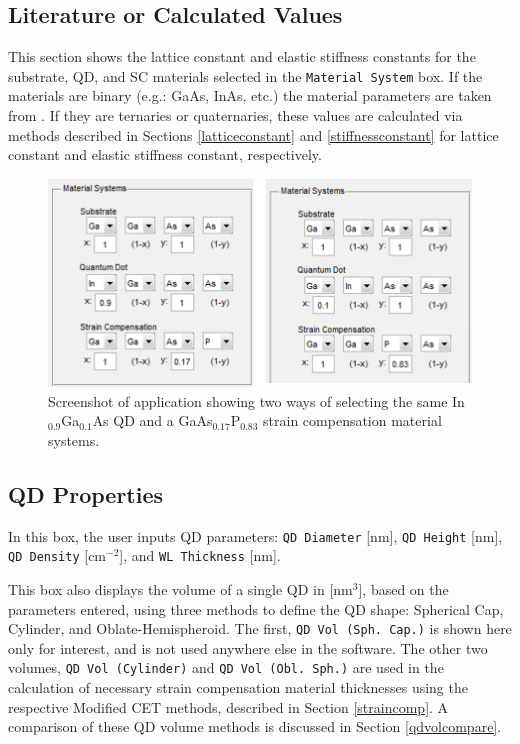\documentclass{article}
\begin{document}
\subsection{Literature or Calculated Values}
This section shows the lattice constant and elastic stiffness constants for the substrate, QD, and SC materials selected in the \texttt{Material System} box. If the materials are binary (e.g.: GaAs, InAs, etc.) the material parameters are taken from \citeauthor{vurgaftman_band_2001} \cite{vurgaftman_band_2001}. If they are ternaries or quaternaries, these values are calculated via methods described in Sections \ref{latticeconstant} and \ref{stiffnessconstant} for lattice constant and elastic stiffness constant, respectively.
\begin{figure}
	\includegraphics[width=0.85\linewidth]{scexemat}
	\centering
	\caption{Screenshot of application showing two ways of selecting the same In$_{0.9}$Ga$_{0.1}$As QD and a GaAs$_{0.17}$P$_{0.83}$ strain compensation material systems.}
	\label{fig:scexemat}
\end{figure}

\subsection{QD Properties}
In this box, the user inputs QD parameters: \texttt{QD Diameter} [nm], \texttt{QD Height} [nm], \texttt{QD Density} [cm$^{-2}$], and \texttt{WL Thickness} [nm].

This box also displays the volume of a single QD in [nm$^{3}$], based on the parameters entered, using three methods to define the QD shape: Spherical Cap, Cylinder, and Oblate-Hemispheroid. The first, \texttt{QD Vol (Sph. Cap.)} is shown here only for interest, and is not used anywhere else in the software. The other two volumes, \texttt{QD Vol (Cylinder)} and \texttt{QD Vol (Obl. Sph.)} are used in the calculation of necessary strain compensation material thicknesses using the respective Modified CET methods, described in Section \ref{straincomp}. A comparison of these QD volume methods is discussed in Section \ref{qdvolcompare}.
\end{document}
